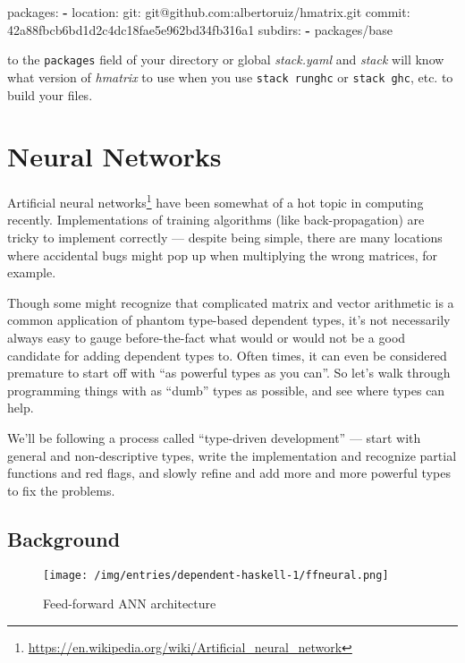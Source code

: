 \documentclass[]{article}
\newenvironment{Shaded}{}{}
\newcommand{\KeywordTok}[1]{\textcolor[rgb]{0.00,0.44,0.13}{\textbf{{#1}}}}
\newcommand{\FunctionTok}[1]{\textcolor[rgb]{0.02,0.16,0.49}{{#1}}}
\newcommand{\NormalTok}[1]{{#1}}
\renewcommand{\href}[2]{#2\footnote{\url{#1}}}
\begin{document}
\begin{Shaded}
\begin{Highlighting}[]
\FunctionTok{packages:}
\KeywordTok{-} \FunctionTok{location:}
    \FunctionTok{git:} \NormalTok{git@github.com:albertoruiz/hmatrix.git}
    \FunctionTok{commit:} \NormalTok{42a88fbcb6bd1d2c4dc18fae5e962bd34fb316a1}
  \FunctionTok{subdirs:}
    \KeywordTok{-} \NormalTok{packages/base}
\end{Highlighting}
\end{Shaded}

to the \texttt{packages} field of your directory or global \emph{stack.yaml} and
\emph{stack} will know what version of \emph{hmatrix} to use when you use
\texttt{stack\ runghc} or \texttt{stack\ ghc}, etc. to build your files.

\section{Neural Networks}\label{neural-networks}

\href{https://en.wikipedia.org/wiki/Artificial_neural_network}{Artificial neural
networks} have been somewhat of a hot topic in computing recently.
Implementations of training algorithms (like back-propagation) are tricky to
implement correctly --- despite being simple, there are many locations where
accidental bugs might pop up when multiplying the wrong matrices, for example.

Though some might recognize that complicated matrix and vector arithmetic is a
common application of phantom type-based dependent types, it's not necessarily
always easy to gauge before-the-fact what would or would not be a good candidate
for adding dependent types to. Often times, it can even be considered premature
to start off with ``as powerful types as you can''. So let's walk through
programming things with as ``dumb'' types as possible, and see where types can
help.

We'll be following a process called ``type-driven development'' --- start with
general and non-descriptive types, write the implementation and recognize
partial functions and red flags, and slowly refine and add more and more
powerful types to fix the problems.

\subsection{Background}\label{background}

\begin{figure}[htbp]
\centering
\texttt{[image: /img/entries/dependent-haskell-1/ffneural.png]}
\caption{Feed-forward ANN architecture}
\end{figure}
\end{document}
